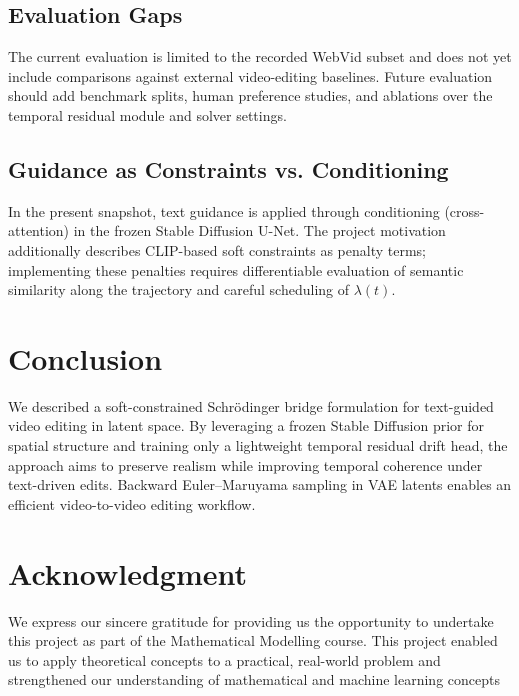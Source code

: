 \documentclass[journal]{IEEEtran}
\begin{document}
\subsection{Evaluation Gaps}
The current evaluation is limited to the recorded WebVid subset and does not yet include comparisons against external video-editing baselines. Future evaluation should add benchmark splits, human preference studies, and ablations over the temporal residual module and solver settings.

\subsection{Guidance as Constraints vs. Conditioning}
In the present snapshot, text guidance is applied through conditioning (cross-attention) in the frozen Stable Diffusion U-Net. The project motivation additionally describes CLIP-based soft constraints as penalty terms; implementing these penalties requires differentiable evaluation of semantic similarity along the trajectory and careful scheduling of $\lambda(t)$.

\section{Conclusion}
We described a soft-constrained Schr\"{o}dinger bridge formulation for text-guided video editing in latent space. By leveraging a frozen Stable Diffusion prior for spatial structure and training only a lightweight temporal residual drift head, the approach aims to preserve realism while improving temporal coherence under text-driven edits. Backward Euler--Maruyama sampling in VAE latents enables an efficient video-to-video editing workflow.

\section*{Acknowledgment}
We express our sincere gratitude for providing us the opportunity to undertake this project as part of the Mathematical Modelling course. This project enabled us to apply theoretical concepts to a practical, real-world problem and strengthened our understanding of mathematical and machine learning concepts



\end{document}
